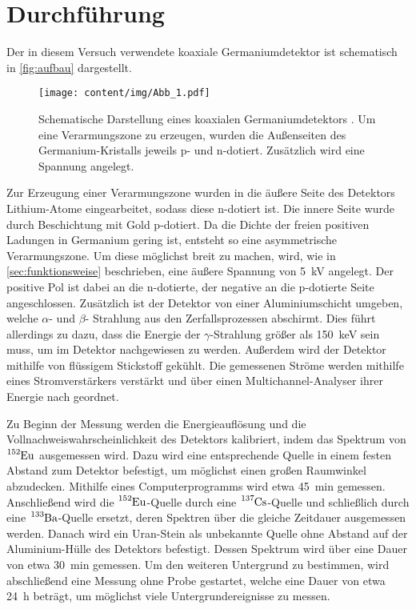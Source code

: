\section{Durchführung}
\label{sec:durchfuehrung}

Der in diesem Versuch verwendete koaxiale Germaniumdetektor ist schematisch in \autoref{fig:aufbau} dargestellt.
\begin{figure}
    \centering
    \texttt{[image: content/img/Abb\_1.pdf]}
    \caption{
        Schematische Darstellung eines koaxialen Germaniumdetektors \cite{versuchsanleitung}.
        Um eine Verarmungszone zu erzeugen,
        wurden die Außenseiten des Germanium-Kristalls jeweils p- und n-dotiert.
        Zusätzlich wird eine Spannung angelegt.
    }
    \label{fig:aufbau}
\end{figure}

Zur Erzeugung einer Verarmungszone wurden in die äußere Seite des Detektors Lithium-Atome eingearbeitet,
sodass diese n-dotiert ist.
Die innere Seite wurde durch Beschichtung mit Gold p-dotiert.
Da die Dichte der freien positiven Ladungen in Germanium gering ist,
entsteht so eine asymmetrische Verarmungszone.
Um diese möglichst breit zu machen,
wird,
wie in \autoref{sec:funktionsweise} beschrieben,
eine äußere Spannung von \SI{5}{\kilo\volt} angelegt.
Der positive Pol ist dabei an die n-dotierte,
der negative an die p-dotierte Seite angeschlossen.
Zusätzlich ist der Detektor von einer Aluminiumschicht umgeben,
welche $\alpha$- und $\beta$- Strahlung aus den Zerfallsprozessen abschirmt.
Dies führt allerdings zu dazu,
dass die Energie der $\gamma$-Strahlung größer als \SI{150}{\kilo\eV} sein muss,
um im Detektor nachgewiesen zu werden.
Außerdem wird der Detektor mithilfe von flüssigem Stickstoff gekühlt.
Die gemessenen Ströme werden mithilfe eines Stromverstärkers verstärkt und über einen Multichannel-Analyser ihrer Energie nach geordnet.

Zu Beginn der Messung werden die Energieauflösung und die Vollnachweiswahrscheinlichkeit des Detektors kalibriert,
indem das Spektrum von $\ce{^152Eu}$ ausgemessen wird.
Dazu wird eine entsprechende Quelle in einem festen Abstand zum Detektor befestigt,
um möglichst einen großen Raumwinkel abzudecken.
Mithilfe eines Computerprogramms wird etwa \SI{45}{\minute} gemessen.
Anschließend wird die $\ce{^152Eu}$-Quelle durch eine $\ce{^137Cs}$-Quelle und schließlich durch eine $\ce{^133Ba}$-Quelle ersetzt,
deren Spektren über die gleiche Zeitdauer ausgemessen werden.
Danach wird ein Uran-Stein als unbekannte Quelle ohne Abstand auf der Aluminium-Hülle des Detektors befestigt.
Dessen Spektrum wird über eine Dauer von etwa \SI{30}{\minute} gemessen.
Um den weiteren Untergrund zu bestimmen,
wird abschließend eine Messung ohne Probe gestartet,
welche eine Dauer von etwa \SI{24}{\hour} beträgt,
um möglichst viele Untergrundereignisse zu messen.
